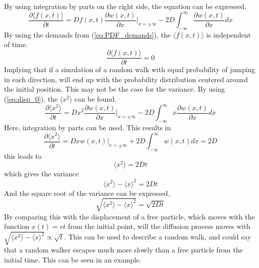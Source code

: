 \documentclass[%
twoside,                 %
final,                   %
chapterprefix=true,      %
open=right               %
10pt]{book}
\begin{document}
By using integration by parts on the right side, the equation can be expressed,
\begin{equation} \label{eq:disp_0}
\frac{\partial \langle f(x,t) \rangle}{\partial t} = D f(x,t) \frac{\partial w(x,t)}{\partial x}|_{x=\pm \infty} - 2D \int^{\infty}_{-\infty} \frac{\partial w(x,t)}{\partial x}dx
\end{equation}
By using the demands from (\ref{eq:PDF_demands}), the $\langle f(x,t) \rangle$ is independent of time. 
\begin{equation}
\frac{\partial \langle f(x,t) \rangle}{\partial t} = 0
\end{equation}
Implying that if a simulation of a random walk with equal probability of jumping in each direction, will end up with the probability distribution centered around the initial position. This may not be the case for the variance. By using (\ref{eq:disp_0}), the $\langle x^2 \rangle $ can be found. 
\begin{equation} 
\frac{\partial \langle x^2 \rangle}{\partial t} = D x^2 \frac{\partial w(x,t)}{\partial x}|_{x=\pm \infty} - 2D \int^{\infty}_{-\infty} x\frac{\partial w(x,t)}{\partial x}dx
\end{equation}
Here, integration by parts can be used. This results in
\begin{equation}
\frac{\partial \langle x^2 \rangle}{\partial t} = D x w(x,t)|_{x=\pm \infty} + 2D \int^{\infty}_{-\infty} w(x,t)dx = 2D
\end{equation}
this leads to
\begin{equation}
\langle x^2 \rangle = 2Dt
\end{equation}
which gives the variance
\begin{equation} \label{eq:diff_var}
\langle x^2 \rangle -\langle x \rangle^2 = 2Dt
\end{equation}
And the square root of the variance can be expressed,
\begin{equation}
\sqrt{\langle x^2 \rangle -\langle x \rangle^2} = \sqrt{2Dt}
\end{equation}
By comparing this with the displacement of a free particle, which moves with the function $x(t)=vt$ from the initial point, will the diffusion process moves with $\sqrt{\langle x^2 \rangle -\langle x \rangle^2} \propto \sqrt{t}$. This can be used to describe a random walk, and could say that a random walker escapes much more slowly than a free particle from the initial time. This can be seen in an example. 
\end{document}
